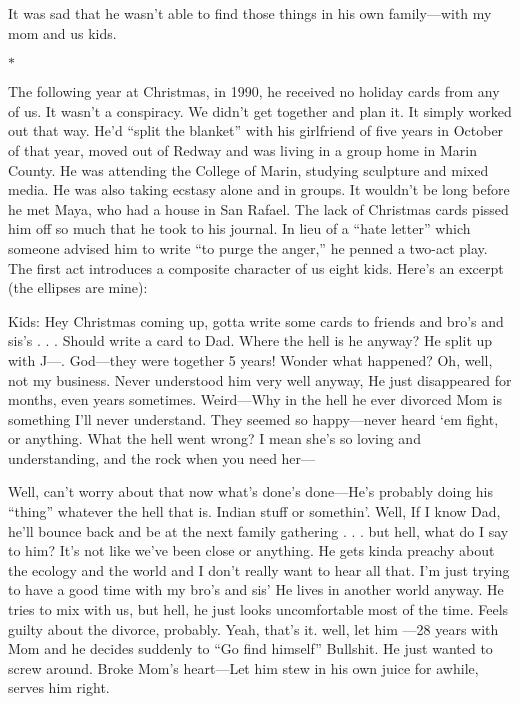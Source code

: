 \documentclass[12pt]{book}
\begin{document}
It was sad that he wasn't able to find those things in his own family---with my mom and us kids.

\begin{center}$*$\end{center}

The following year at Christmas, in 1990, he received no holiday cards from any of us. It wasn't a conspiracy. We didn't get together and plan it. It simply worked out that way. He'd ``split the blanket'' with his girlfriend of five years in October of that year, moved out of Redway and was living in a group home in Marin County. He was attending the College of Marin, studying sculpture and mixed media. He was also taking ecstasy alone and in groups. It wouldn't be long before he met Maya, who had a house in San Rafael. The lack of Christmas cards pissed him off so much that he took to his journal. In lieu of a ``hate letter'' which someone advised him to write ``to purge the anger,'' he penned a two-act play. The first act introduces a composite character of us eight kids. Here's an excerpt (the ellipses are mine):

Kids: Hey Christmas coming up, gotta write some cards to friends and bro's and sis's . . . Should write a card to Dad. Where the hell is he anyway? He split up with J---. God---they were together 5 years! Wonder what happened? Oh, well, not my business. Never understood him very well anyway, He just disappeared for months, even years sometimes. Weird---Why in the hell he ever divorced Mom is something I'll never understand. They seemed so happy---never heard `em fight, or anything. What the hell went wrong? I mean she's so loving and understanding, and the rock when you need her---

Well, can't worry about that now what's done's done---He's probably doing his ``thing'' whatever the hell that is. Indian stuff or somethin'. Well, If I know Dad, he'll bounce back and be at the next family gathering . . . but hell, what do I say to him? It's not like we've been close or anything. He gets kinda preachy about the ecology and the world and I don't really want to hear all that. I'm just trying to have a good time with my bro's and sis' He lives in another world anyway. He tries to mix with us, but hell, he just looks uncomfortable most of the time. Feels guilty about the divorce, probably. Yeah, that's it. well, let him ---28 years with Mom and he decides suddenly to ``Go find himself'' Bullshit. He just wanted to screw around. Broke Mom's heart---Let him stew in his own juice for awhile, serves him right.
\end{document}
